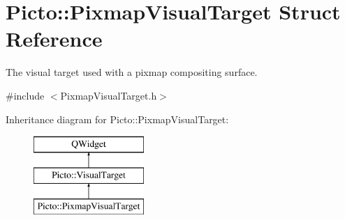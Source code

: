 \hypertarget{struct_picto_1_1_pixmap_visual_target}{\section{Picto\-:\-:Pixmap\-Visual\-Target Struct Reference}
\label{struct_picto_1_1_pixmap_visual_target}
}


The visual target used with a pixmap compositing surface.  




{\ttfamily \#include $<$Pixmap\-Visual\-Target.\-h$>$}

Inheritance diagram for Picto\-:\-:Pixmap\-Visual\-Target\-:\begin{figure}[H]
\begin{center}
\leavevmode
\includegraphics[height=3.000000cm]{struct_picto_1_1_pixmap_visual_target}
\end{center}
\end{figure}
